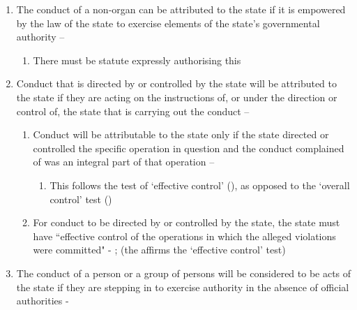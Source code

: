 \begin{enumerate}
\begin{enumerate}
\begin{enumerate}
        \end{enumerate}
        \item The conduct of a non-organ can be attributed to the state if it is empowered by the law of the state to exercise elements of the state's governmental authority -- 
        \begin{enumerate}
            \item There must be statute expressly authorising this
        \end{enumerate}
        \item Conduct that is directed by or controlled by the state will be attributed to the state if they are acting on the instructions of, or under the direction or control of, the state that is carrying out the conduct -- 
        \begin{enumerate}
            \item Conduct will be attributable to the state only if the state directed or controlled the specific operation in question and the conduct complained of was an integral part of that operation -- 
            \begin{enumerate}
                \item This follows the test of `effective control' (), as opposed to the `overall control' test ()
            \end{enumerate}
            \item For conduct to be directed by or controlled by the state, the state must have ``effective control of the operations in which the alleged violations were committed" - ;  (the  affirms the `effective control' test)
        \end{enumerate}
        \item The conduct of a person or a group of persons will be considered to be acts of the state if they are stepping in to exercise authority in the absence of official authorities - 
        \begin{enumerate}

\end{enumerate}
\end{enumerate}
\end{enumerate}
